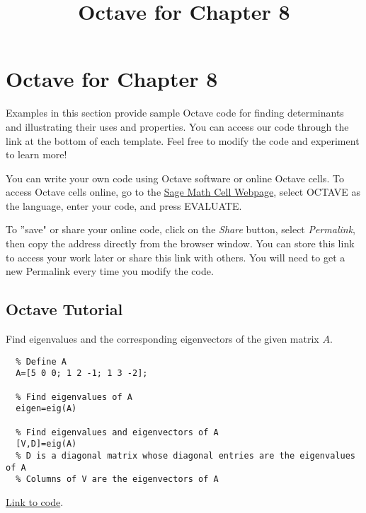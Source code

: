 \documentclass{ximera}
\title{Octave for Chapter 8} \license{CC BY-NC-SA 4.0}
\begin{document}
\begin{abstract}
\end{abstract}
\maketitle

\section*{Octave for Chapter 8}

Examples in this section provide sample Octave code for finding determinants and illustrating their uses and properties. You can access our code through the link at the bottom of each template.  Feel free to modify the code and experiment to learn more!  

You can write your own code using Octave software or online Octave cells.  To access Octave cells online, go to the \href{https://sagecell.sagemath.org/}{Sage Math Cell Webpage}, select OCTAVE as the language, enter your code, and press EVALUATE.  

To ''save" or share your online code, click on the \emph{Share} button, select \emph{Permalink}, then copy the address directly from the browser window.  You can store this link to access your work later or share this link with others.  You will need to get a new Permalink every time you modify the code.

\subsection*{Octave Tutorial}

\begin{template}\label{temp:eigen}
  Find eigenvalues and the corresponding eigenvectors of the given matrix $A$.
  
  \begin{verbatim}
  % Define A
  A=[5 0 0; 1 2 -1; 1 3 -2];
  
  % Find eigenvalues of A
  eigen=eig(A)
  
  % Find eigenvalues and eigenvectors of A
  [V,D]=eig(A)
  % D is a diagonal matrix whose diagonal entries are the eigenvalues of A
  % Columns of V are the eigenvectors of A 
  \end{verbatim}
  
  \href{https://sagecell.sagemath.org/?z=eJx1jkELgkAUhO8L_oe5LBQkqNFJPCxJP8GLeFjyqQ90F9a1-vmpkEXU5Q0zzPcYiZwaNgQVCJWVJ0SIUsRIEMaLHhEmVRqIQEhc2NQgbsncdD_RCNss2Jpk892p_Z-i3jxdvXUvsiwOebWREjl47qJm3VqjewzaO37g3tmR3imZOV2eOoLv6MciibPtp8Gsvvgqfix4AsFaTeY=&lang=octave&interacts=eJyLjgUAARUAuQ==}{Link to code}.
  \end{template}
  
\end{document}
